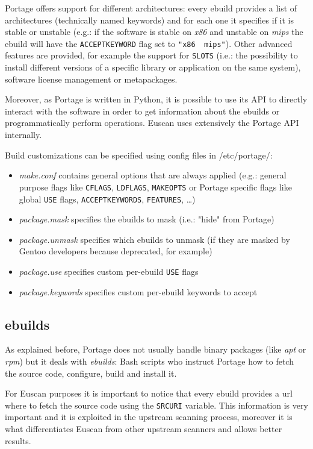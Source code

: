 Portage offers support for different architectures: every ebuild provides a list of architectures (technically named keywords) and for each one it specifies if it is stable or unstable (e.g.: if the software is stable on \emph{x86} and unstable on \emph{mips} the ebuild will have the \texttt{ACCEPT\textunderscore KEYWORD} flag set to \texttt{"x86 ~mips"}). 
Other advanced features are provided, for example the support for \texttt{SLOTS} (i.e.: the possibility to install different versions of a specific library or application on the same system), software license management or metapackages.

Moreover, as Portage is written in Python, it is possible to use its API to directly interact with the software in order to get information about the ebuilds or programmatically perform operations. Euscan uses extensively the Portage API internally.

\vspace{0.5cm}

Build customizations can be specified using config files in /etc/portage/:
\begin{itemize}
\item \emph{make.conf} contains general options that are always applied (e.g.: general  purpose flags like \texttt{CFLAGS}, \texttt{LDFLAGS}, \texttt{MAKEOPTS} or Portage specific flags like global \texttt{USE} flags, \texttt{ACCEPT\textunderscore KEYWORDS}, \texttt{FEATURES}, \ldots)
\item \emph{package.mask} specifies the ebuilds to mask (i.e.: "hide" from Portage)
\item \emph{package.unmask} specifies which ebuilds to unmask (if they are masked by Gentoo developers because deprecated, for example)
\item \emph{package.use} specifies custom per-ebuild \texttt{USE} flags
\item \emph{package.keywords} specifies custom per-ebuild keywords to accept
\end{itemize}


\subsection{ebuilds}
As explained before, Portage does not usually handle binary packages (like \emph{apt} or \emph{rpm}) but it deals with \emph{ebuilds}: Bash scripts who instruct Portage how to fetch the source code, configure, build and install it.

For Euscan purposes it is important to notice that every ebuild provides a url where to fetch the source code using the \texttt{SRC\textunderscore URI} variable. This information is very important and it is exploited in the upstream scanning process, moreover it is what differentiates Euscan from other upstream scanners and allows better results.


